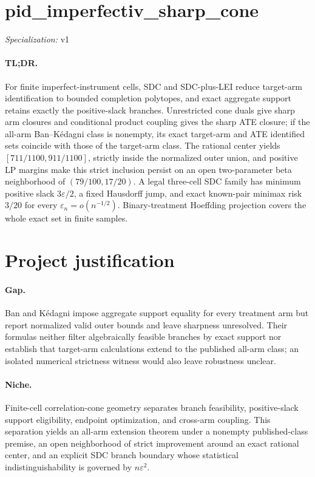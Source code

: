 \documentclass{article}
\begin{document}
\sloppy

\section*{pid\_\allowbreak{}imperfectiv\_\allowbreak{}sharp\_\allowbreak{}cone}

\noindent\textit{Specialization:} v1\par

\paragraph{TL;DR.} For finite imperfect-instrument cells, SDC and SDC-plus-LEI reduce target-arm identification to bounded completion polytopes, and exact aggregate support retains exactly the positive-slack branches. Unrestricted cone duals give sharp arm closures and conditional product coupling gives the sharp ATE closure; if the all-arm Ban--Kédagni class is nonempty, its exact target-arm and ATE identified sets coincide with those of the target-arm class. The rational center yields \([711/1100,911/1100]\), strictly inside the normalized outer union, and positive LP margins make this strict inclusion persist on an open two-parameter beta neighborhood of \((79/100,17/20)\). A legal three-cell SDC family has minimum positive slack \(3\varepsilon/2\), a fixed Hausdorff jump, and exact known-pair minimax risk \(3/20\) for every \(\varepsilon_n=o(n^{-1/2})\). Binary-treatment Hoeffding projection covers the whole exact set in finite samples.

\section{Project justification}

\paragraph{Gap.} Ban and Kédagni impose aggregate support equality for every treatment arm but report normalized valid outer bounds and leave sharpness unresolved. Their formulas neither filter algebraically feasible branches by exact support nor establish that target-arm calculations extend to the published all-arm class; an isolated numerical strictness witness would also leave robustness unclear.

\paragraph{Niche.} Finite-cell correlation-cone geometry separates branch feasibility, positive-slack support eligibility, endpoint optimization, and cross-arm coupling. This separation yields an all-arm extension theorem under a nonempty published-class premise, an open neighborhood of strict improvement around an exact rational center, and an explicit SDC branch boundary whose statistical indistinguishability is governed by \(n\varepsilon^2\).
\end{document}
